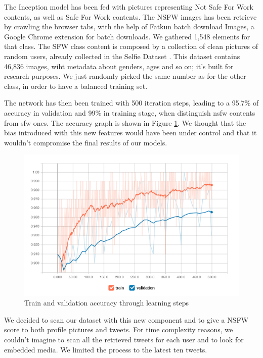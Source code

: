 The Inception model has been fed with pictures representing Not Safe For Work contents, as well as Safe For Work contents.
The NSFW images has been retrieve by crawling the browser tabs, with the help of Fatkun batch download Images, a Google Chrome extension for batch downloads.
We gathered 1,548 elements for that class.
The SFW class content is composed by a collection of clean pictures of random users, already collected in the Selfie Dataset \cite{selfie} . This dataset contains 46,836 images, wiht metadata about genders, ages and so on; it's built for research purposes.
We just randomly picked the same number as for the other class, in order to have a balanced training set.

The network has then been trained with 500 iteration steps, leading to a  95.7\% of accuracy in validation and 99\% in training stage, when distinguish nsfw contents from sfw ones. The accuracy graph is shown in Figure \ref{fig:inception}.
We thought that the bias introduced with this new features would have been under control and that it wouldn't compromise the final results of our models.

\begin{figure}[htp!]
	\centering
	\includegraphics[width=\columnwidth]{chapter4/figure/inception.jpg}
	\caption{Train and validation accuracy through learning steps}
	\label{fig:inception}
\end{figure}

We decided to scan our dataset with this new component and to give a NSFW score to both profile pictures and tweets.
For time complexity reasons, we couldn't imagine to scan all the retrieved tweets for each user and to look for embedded media. We limited the process to the latest ten tweets.

